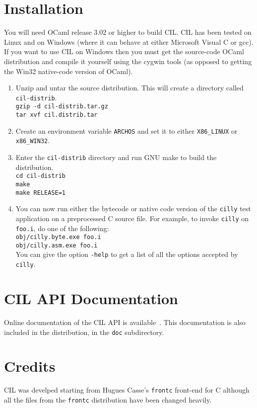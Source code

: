 \documentclass{article}
\newcommand{\hsp}{\hspace{0.5in}}
\newcommand{\t}[1]{{\tt #1}}
\begin{document}
\section{Installation}

You will need OCaml release 3.02 or higher to build CIL. CIL has been tested
on Linux and on Windows (where it can behave at either Microsoft Visual C or
gcc). If you want to use CIL on Windows then you must get the source-code
OCaml distribution and compile it yourself using the cygwin tools (as opposed
to getting the Win32 native-code version of OCaml).

\begin{enumerate}
\item Unzip and untar the source distribution. This will create a directory
      called \t{cil-distrib}. \\
      \hsp\verb!gzip -d cil-distrib.tar.gz!\\
      \hsp\verb!tar xvf cil.distrib.tar!
\item Create an environment variable \t{ARCHOS} and set it to either
      \t{X86\_LINUX} or \t{x86\_WIN32}.
\item Enter the \t{cil-distrib} directory and run GNU make to build the 
      distribution.\\
      \hsp\verb!cd cil-distrib!\\
      \hsp\verb!make!\\
      \hsp\verb!make RELEASE=1!\\

\item You can now run either the bytecode or native code version of the
      \t{cilly} test application on a preprocessed C source file. For example,
      to invoke \t{cilly} on \t{foo.i}, do one of the following:\\
      \hsp\verb!obj/cilly.byte.exe foo.i!\\
      \hsp\verb!obj/cilly.asm.exe foo.i!\\
      You can give the option \verb!-help! to get a list of all
      the options accepted by \t{cilly}.
\end{enumerate}

\section{CIL API Documentation} 
Online documentation of the CIL API is available~. This
documentation is also included in the distribution, in the \t{doc}
subdirectory. 

\section{Credits}

 CIL was develped starting from Hugues Casse's \t{frontc} front-end for C
although all the files from the \t{frontc} distribution have been changed
heavily. 
 
\end{document}

